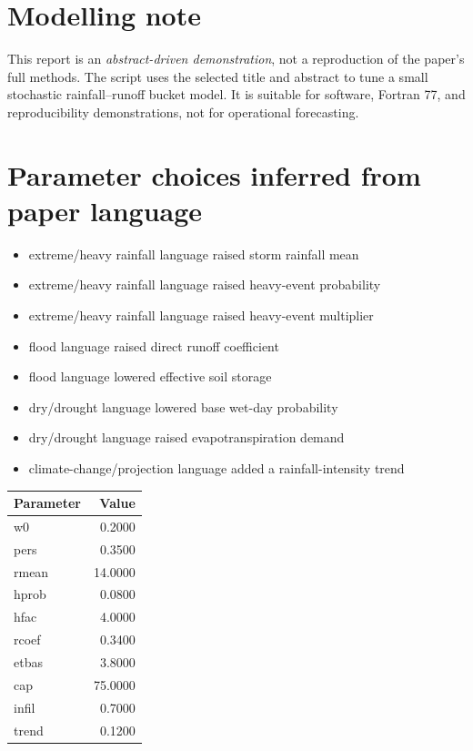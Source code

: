 \documentclass[11pt]{article}
\begin{document}
\section*{Modelling note}
This report is an \emph{abstract-driven demonstration}, not a reproduction of the
paper's full methods. The script uses the selected title and abstract to tune a
small stochastic rainfall--runoff bucket model. It is suitable for software,
Fortran 77, and reproducibility demonstrations, not for operational forecasting.

\section*{Parameter choices inferred from paper language}
\begin{itemize}
\item extreme/heavy rainfall language raised storm rainfall mean
\item extreme/heavy rainfall language raised heavy-event probability
\item extreme/heavy rainfall language raised heavy-event multiplier
\item flood language raised direct runoff coefficient
\item flood language lowered effective soil storage
\item dry/drought language lowered base wet-day probability
\item dry/drought language raised evapotranspiration demand
\item climate-change/projection language added a rainfall-intensity trend
\end{itemize}

\begin{center}
\begin{tabular}{lr}
\toprule
Parameter & Value \\
\midrule
w0 & 0.2000 \\
pers & 0.3500 \\
rmean & 14.0000 \\
hprob & 0.0800 \\
hfac & 4.0000 \\
rcoef & 0.3400 \\
etbas & 3.8000 \\
cap & 75.0000 \\
infil & 0.7000 \\
trend & 0.1200 \\
\bottomrule
\end{tabular}
\end{center}
\end{document}
